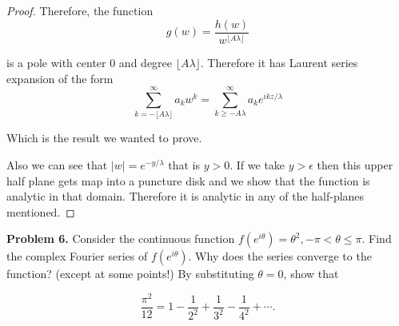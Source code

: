 \documentclass[letterpaper,twoside,11pt]{article}
\begin{document}
\begin{proof}
Therefore, the function
\begin{equation}
g(w)=\frac{h(w)}{w^{\lfloor A\lambda\rfloor}} \nonumber
\end{equation}

is a pole with center 0 and degree ${\lfloor A\lambda\rfloor}$. Therefore it has Laurent series expansion of the form
\begin{equation}
\sum_{k={-\lfloor A\lambda\rfloor}}^{\infty} a_kw^{k} = \sum_{k\geq {- A\lambda}}^{\infty} a_ke^{ikz/\lambda}  \nonumber
\end{equation}

Which is the result we wanted to prove.

Also we can see that $|w|=e^{-y/\lambda}$ that is $y>0$.  If we take $y>\epsilon$ then this upper half plane gets map into a puncture disk and we show that the function is analytic in that domain. Therefore it is analytic in any of the half-planes mentioned. 
\end{proof}
\newpage

\textbf{Problem 6.} Consider the continuous function $f(e^{i\theta}) = \theta^2, -\pi < \theta \leq \pi$. Find
the complex Fourier series of $f(e^{i\theta})$. Why does the series converge to the function? (except at some
points!) By substituting $\theta = 0$, show that

\begin{equation}
\frac{\pi^2}{12}=1-\frac{1}{2^2}+\frac{1}{3^2}-\frac{1}{4^2}+\cdots . \nonumber
\end{equation}
\end{document}
